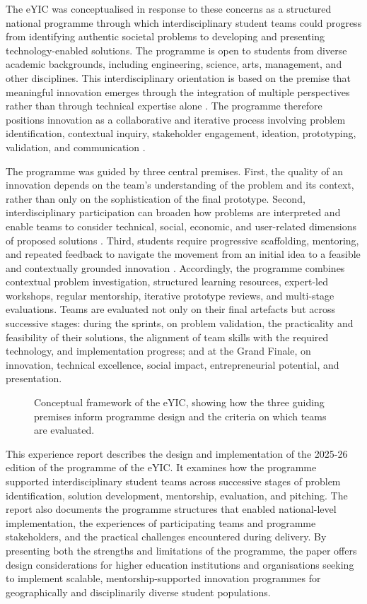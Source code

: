 \documentclass[runningheads]{llncs}
\begin{document}
The eYIC was conceptualised in response to these concerns as a structured national programme through which interdisciplinary student teams could progress from identifying authentic societal problems to developing and presenting technology-enabled solutions. The programme is open to students from diverse academic backgrounds, including engineering, science, arts, management, and other disciplines. This interdisciplinary orientation is based on the premise that meaningful innovation emerges through the integration of multiple perspectives rather than through technical expertise alone \cite{b13}. The programme therefore positions innovation as a collaborative and iterative process involving problem identification, contextual inquiry, stakeholder engagement, ideation, prototyping, validation, and communication \cite{b9,b10,b11}.

The programme was guided by three central premises. First, the quality of an innovation depends on the team’s understanding of the problem and its context, rather than only on the sophistication of the final prototype. Second, interdisciplinary participation can broaden how problems are interpreted and enable teams to consider technical, social, economic, and user-related dimensions of proposed solutions \cite{b13}. Third, students require progressive scaffolding, mentoring, and repeated feedback to navigate the movement from an initial idea to a feasible and contextually grounded innovation \cite{b12}. Accordingly, the programme combines contextual problem investigation, structured learning resources, expert-led workshops, regular mentorship, iterative prototype reviews, and multi-stage evaluations. Teams are evaluated not only on their final artefacts but across successive stages: during the sprints, on problem validation, the practicality and feasibility of their solutions, the alignment of team skills with the required technology, and implementation progress; and at the Grand Finale, on innovation, technical excellence, social impact, entrepreneurial potential, and presentation.

\begin{figure}[htbp]
\centering

\caption{Conceptual framework of the eYIC, showing how the three guiding premises inform programme design and the criteria on which teams are evaluated.}
\label{fig1}
\end{figure}

This experience report describes the design and implementation of the 2025-26 edition of the programme of the eYIC. It examines how the programme supported interdisciplinary student teams across successive stages of problem identification, solution development, mentorship, evaluation, and pitching. The report also documents the programme structures that enabled national-level implementation, the experiences of participating teams and programme stakeholders, and the practical challenges encountered during delivery. By presenting both the strengths and limitations of the programme, the paper offers design considerations for higher education institutions and organisations seeking to implement scalable, mentorship-supported innovation programmes for geographically and disciplinarily diverse student populations.
\end{document}
